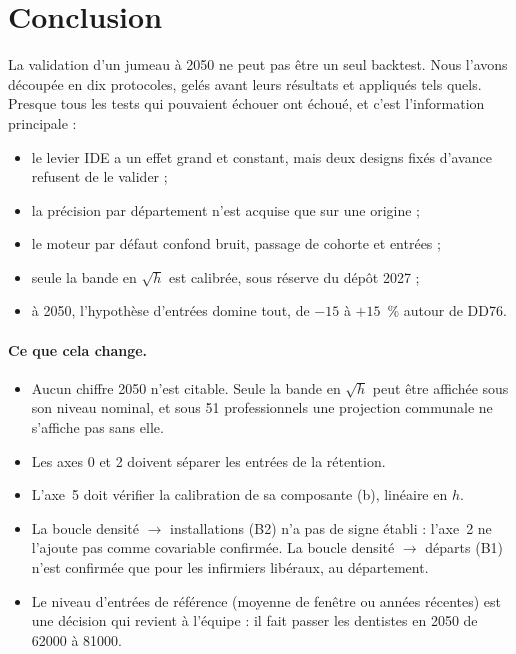 \documentclass[11pt]{article}
\begin{document}
\section{Conclusion}
La validation d'un jumeau à 2050 ne peut pas être un seul backtest. Nous l'avons découpée en dix
protocoles, gelés avant leurs résultats et appliqués tels quels. Presque tous les tests qui pouvaient
échouer ont échoué, et c'est l'information principale :
\begin{itemize}
  \item le levier IDE a un effet grand et constant, mais deux designs fixés d'avance refusent de le
        valider ;
  \item la précision par département n'est acquise que sur une origine ;
  \item le moteur par défaut confond bruit, passage de cohorte et entrées ;
  \item seule la bande en $\sqrt h$ est calibrée, sous réserve du dépôt 2027 ;
  \item à 2050, l'hypothèse d'entrées domine tout, de $-15$ à $+15$\mesure{}~\% autour de DD76.
\end{itemize}

\paragraph{Ce que cela change.}
\begin{itemize}
  \item Aucun chiffre 2050 n'est citable. Seule la bande en $\sqrt h$ peut être affichée sous son niveau
        nominal, et sous 51 professionnels une projection communale ne s'affiche pas sans elle.
  \item Les axes 0 et 2 doivent séparer les entrées de la rétention.
  \item L'axe~5 doit vérifier la calibration de sa composante (b), linéaire en $h$.
  \item La boucle densité $\to$ installations (B2) n'a pas de signe établi : l'axe~2 ne l'ajoute pas comme
        covariable confirmée. La boucle densité $\to$ départs (B1) n'est confirmée que pour les
        infirmiers libéraux, au département.
  \item Le niveau d'entrées de référence (moyenne de fenêtre ou années récentes) est une décision qui
        revient à l'équipe : il fait passer les dentistes en 2050 de \num{62000} à \num{81000}\mesure{}.
\end{itemize}
\end{document}
